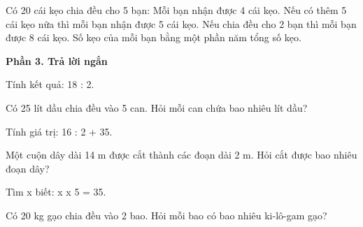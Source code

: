 \begin{ex} %
Có 20 cái kẹo chia đều cho 5 bạn:
\choiceTF
{\True Mỗi bạn nhận được 4 cái kẹo.}
{\True Nếu có thêm 5 cái kẹo nữa thì mỗi bạn nhận được 5 cái kẹo.}
{Nếu chia đều cho 2 bạn thì mỗi bạn được 8 cái kẹo.}
{\True Số kẹo của mỗi bạn bằng một phần năm tổng số kẹo.}
\end{ex}

\textbf{Phần 3. Trả lời ngắn}

\begin{ex} %
Tính kết quả: 18 : 2.
\end{ex}

\begin{ex} %
Có 25 lít dầu chia đều vào 5 can. Hỏi mỗi can chứa bao nhiêu lít dầu?
\end{ex}

\begin{ex} %
Tính giá trị: 16 : 2 + 35.
\end{ex}

\begin{ex} %
Một cuộn dây dài 14 m được cắt thành các đoạn dài 2 m. Hỏi cắt được bao nhiêu đoạn dây?
\end{ex}

\begin{ex} %
Tìm x biết: x x 5 = 35.
\end{ex}

\begin{ex} %
Có 20 kg gạo chia đều vào 2 bao. Hỏi mỗi bao có bao nhiêu ki-lô-gam gạo?
\end{ex}
